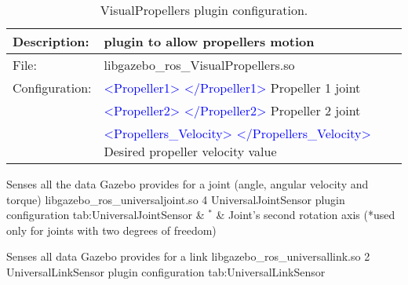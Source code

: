 \begin{table}[h]
	\centering			
	\begin{tabular}{|r|lr|}
		\hline
		\multicolumn{1}{|l|}{Description: } & plugin to allow propellers motion &        \\
		\hline
		\multicolumn{1}{|l|}{File: } & libgazebo\_ros\_VisualPropellers.so &        \\
		\hline
		\multicolumn{1}{|l|}{Configuration:} & \textcolor{blue}{<Propeller1> </Propeller1>} Propeller 1 joint  &         \\
		& \textcolor{blue}{<Propeller2> </Propeller2>} Propeller 2 joint &        \\
		& \textcolor{blue}{<Propellers\_Velocity> </Propellers\_Velocity>} Desired propeller velocity value &         \\
		\hline
	\end{tabular}%
	\caption{VisualPropellers plugin configuration.}
	\label{tab:VisualPropellers}%
\end{table}%



\begin{plugintable}
	{Senses all the data Gazebo provides for a joint (angle, angular velocity and torque)}
	{libgazebo\_ros\_universaljoint.so}
	{4}
	{UniversalJointSensor plugin configuration}
	{tab:UniversalJointSensor}
	& $^*$ & Joint's second rotation axis (*used only for joints with two degrees of freedom) \\
\end{plugintable}

\begin{plugintable}
	{Senses all data Gazebo provides for a link}
	{libgazebo\_ros\_universallink.so}
	{2}
	{UniversalLinkSensor plugin configuration}
	{tab:UniversalLinkSensor}
\end{plugintable}

